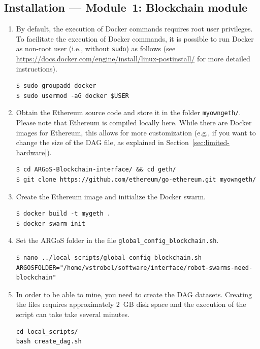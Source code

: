 \documentclass{article}
\begin{document}
\subsection{Installation --- Module~1: Blockchain module}

\begin{enumerate}[leftmargin=*]
\item By default, the execution of Docker commands requires root user
  privileges. To facilitate the execution of Docker commands, it is
  possible to run Docker as non-root user (i.e., without
  \texttt{sudo}) as follows (see
  \url{https://docs.docker.com/engine/install/linux-postinstall/} for
  more detailed instructions).
\begin{verbatim}
$ sudo groupadd docker
$ sudo usermod -aG docker $USER
\end{verbatim}
\item Obtain the Ethereum source code and store it in the folder
\verb|myowngeth/|. Please note that Ethereum is compiled locally
here. While there are Docker images for Ethereum, this allows for more
customization (e.g., if you want to change the size of the DAG file,
as explained in Section~\ref{sec:limited-hardware}).

\begin{verbatim}
$ cd ARGoS-Blockchain-interface/ && cd geth/
$ git clone https://github.com/ethereum/go-ethereum.git myowngeth/
\end{verbatim}
\item Create the Ethereum image and initialize the Docker swarm.

\begin{verbatim}
$ docker build -t mygeth .
$ docker swarm init
\end{verbatim}
\item Set the ARGoS folder in the file \verb|global_config_blockchain.sh|.

\begin{verbatim}
$ nano ../local_scripts/global_config_blockchain.sh
ARGOSFOLDER="/home/vstrobel/software/interface/robot-swarms-need-blockchain"
\end{verbatim}

\item In order to be able to mine, you need to create the DAG
  datasets. Creating the files requires approximately 2~GB disk space
  and the execution of the script can take take several minutes.

\begin{verbatim}
cd local_scripts/
bash create_dag.sh
\end{verbatim}  
  
\end{enumerate}
\end{document}
